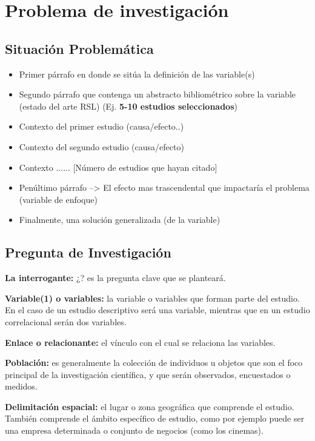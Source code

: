 \chapter{Problema de investigación}
\label{Problemática}

\section{Situación Problemática}
\begin{itemize}
    \item Primer párrafo en donde se sitúa la definición de las variable(s)
    \item Segundo párrafo que contenga un abstracto bibliométrico sobre la variable (estado del arte RSL) (Ej. \textbf{5-10 estudios seleccionados})
    \item Contexto del primer estudio (causa/efecto..)
    \item Contexto del segundo estudio (causa/efecto)
    \item Contexto ...... [Número de estudios que hayan citado]
    \item Penúltimo párrafo --> El efecto mas trascendental que impactaría el problema (variable de enfoque)
    \item Finalmente, una solución generalizada (de la variable)
\end{itemize}


\section{Pregunta de Investigación}

\textbf{La interrogante:} ¿? es la pregunta clave que se planteará.

\textbf{Variable(1) o variables:} la variable o variables que forman parte del estudio. En el caso de un estudio descriptivo será una variable, mientras que en un estudio correlacional serán dos variables.

\textbf{Enlace o relacionante:} el vínculo con el cual se relaciona las variables.

\textbf{Población:} es generalmente la colección de individuos u objetos que son el foco principal de la investigación científica, y que serán observados, encuestados o medidos.

\textbf{Delimitación espacial:} el lugar o zona geográfica que comprende el estudio. También comprende el ámbito específico de estudio, como por ejemplo puede ser una empresa determinada o conjunto de negocios (como los cinemas).

